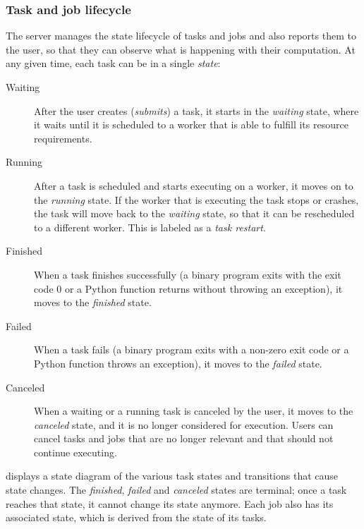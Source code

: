 \subsubsection*{Task and job lifecycle}
The server manages the state lifecycle of tasks and jobs and also reports them to the user, so that
they can observe what is happening with their computation. At any given time, each task can be in a
single \emph{state}:

\begin{description}
	\item[Waiting] After the user creates (\emph{submits}) a task, it starts in the \emph{waiting}
		state, where it waits until it is scheduled to a worker that is able to fulfill its resource
		requirements.
	\item[Running] After a task is scheduled and starts executing on a worker, it moves on to the
		\emph{running} state. If the worker that is executing the task stops or crashes, the task
		will move back to the \emph{waiting} state, so that it can be rescheduled to a different
		worker. This is labeled as a \emph{task restart}.
	\item[Finished] When a task finishes successfully (a binary program exits with the exit code $0$
		or a Python function returns without throwing an exception), it moves to the \emph{finished}
		state.
	\item[Failed] When a task fails (a binary program exits with a non-zero exit code or a Python function throws an
		exception), it moves to the \emph{failed} state.
	\item[Canceled] When a waiting or a running task is canceled by the user, it moves to the \emph{canceled}
		state, and it is no longer considered for execution. Users can cancel tasks and jobs that are no
		longer relevant and that should not continue executing.
\end{description}

 displays a state diagram of the various task states and
transitions that cause state changes. The \emph{finished}, \emph{failed} and
\emph{canceled} states are terminal; once a task reaches that state, it cannot change its
state anymore. Each job also has its associated state, which is derived from the state of its
tasks.

